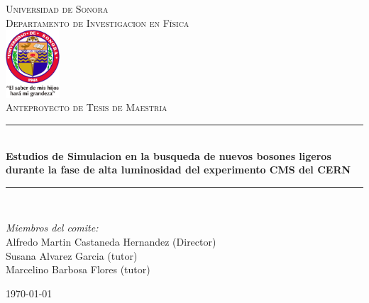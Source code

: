 \newcommand{\HRule}{\rule{\linewidth}{0.5mm}} 

\begin{titlepage}
\center
\textsc{
\Huge{Universidad de Sonora}\\[.5cm]
\Large
Departamento de Investigacion en Física\\[1cm] 
\includegraphics[width=2cm]{unison}\\[3cm]
Anteproyecto de Tesis de Maestria}\\[.7cm] 

\sffamily
\HRule \\[0.4cm]
\textbf{\LARGE Estudios de Simulacion en la busqueda de nuevos bosones ligeros durante la fase de alta luminosidad del experimento CMS del CERN}\\[0.2cm] 
\HRule \\[3cm]
 
\large
\begin{minipage}[t]{.6\textwidth}
\begin{flushleft}
\emph{Miembros del comite:}
\\
Alfredo Martin Castaneda Hernandez (Director)\\
Susana Alvarez Garcia (tutor)\\
Marcelino Barbosa Flores (tutor)\\
\end{flushleft}

\end{minipage}\hfill




{\today}\\[3cm]

\end{titlepage}


